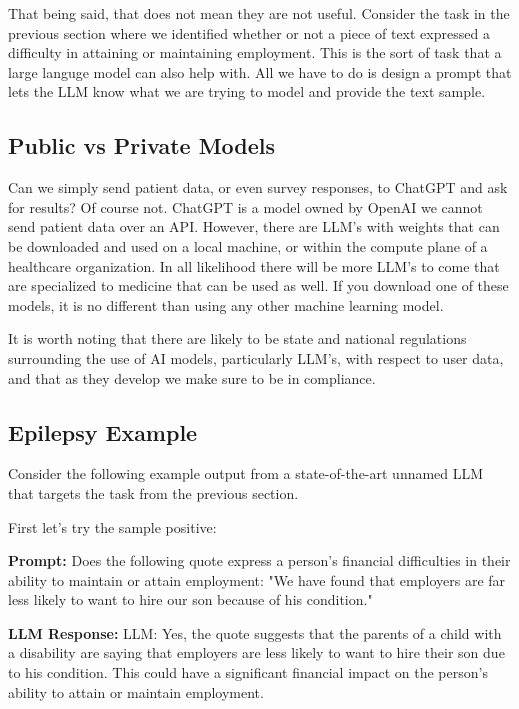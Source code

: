 That being said, that does not mean they are not useful. Consider the task in the previous section where we identified whether or not a piece of text
expressed a difficulty in attaining or maintaining employment. This is the sort of task that a large languge model can also help with. All we have to do
is design a prompt that lets the LLM know what we are trying to model and provide the text sample.

\subsection{Public vs Private Models}

Can we simply send patient data, or even survey responses, to ChatGPT and ask for results? Of course not. ChatGPT is a model owned by OpenAI we cannot send
patient data over an API. However, there are LLM's with weights that can be downloaded and used on a local machine, or within the compute plane of a healthcare
organization. In all likelihood there will be more LLM's to come that are specialized to medicine that can be used as well. If you download one of these models,
it is no different than using any other machine learning model.

It is worth noting that there are likely to be state and national regulations surrounding the use of AI models, particularly LLM's, with respect to user data, and
that as they develop we make sure to be in compliance.

\subsection{Epilepsy Example}

Consider the following example output from a state-of-the-art unnamed LLM that targets the task from the previous section.

First let's try the sample positive:

\begin{displayquote}
  \textbf{Prompt:} Does the following quote express a person's financial difficulties in their ability to maintain or attain employment: "We have found that employers are far less likely to want to hire our son because of his condition."
\end{displayquote}

\begin{displayquote}
  \textbf{LLM Response:} LLM: Yes, the quote suggests that the parents of a child with a disability are saying that employers are less likely to want to hire their son due to his condition. This could have a significant financial impact on the person's ability to attain or maintain employment.
\end{displayquote}

